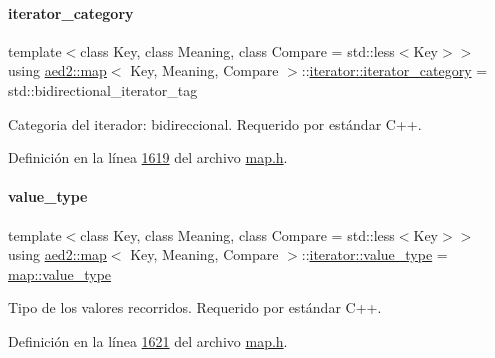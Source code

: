 \begin{Indent}
\paragraph{\texorpdfstring{iterator\+\_\+category}{iterator\_category}}
{\footnotesize\ttfamily template$<$class Key, class Meaning, class Compare = std\+::less$<$\+Key$>$$>$ \\
using \hyperlink{classaed2_1_1map}{aed2\+::map}$<$ Key, Meaning, Compare $>$\+::\hyperlink{classaed2_1_1map_1_1iterator_a709df3d8aef6fd1eeb839616b554ff0b_a709df3d8aef6fd1eeb839616b554ff0b}{iterator\+::iterator\+\_\+category} =  std\+::bidirectional\+\_\+iterator\+\_\+tag}



Categoria del iterador\+: bidireccional. Requerido por estándar C++. 



Definición en la línea \hyperlink{map_8h_source_l01619}{1619} del archivo \hyperlink{map_8h_source}{map.\+h}.

\mbox{\label{classaed2_1_1map_1_1iterator_a4e1d954ef5c6a64bbcd881854f039a16_a4e1d954ef5c6a64bbcd881854f039a16}} 
\paragraph{\texorpdfstring{value\+\_\+type}{value\_type}}
{\footnotesize\ttfamily template$<$class Key, class Meaning, class Compare = std\+::less$<$\+Key$>$$>$ \\
using \hyperlink{classaed2_1_1map}{aed2\+::map}$<$ Key, Meaning, Compare $>$\+::\hyperlink{classaed2_1_1map_1_1iterator_a4e1d954ef5c6a64bbcd881854f039a16_a4e1d954ef5c6a64bbcd881854f039a16}{iterator\+::value\+\_\+type} =  \hyperlink{classaed2_1_1map_a719db98e0ff9a837610f76be33264680_a719db98e0ff9a837610f76be33264680}{map\+::value\+\_\+type}}



Tipo de los valores recorridos. Requerido por estándar C++. 



Definición en la línea \hyperlink{map_8h_source_l01621}{1621} del archivo \hyperlink{map_8h_source}{map.\+h}.

\mbox{\label{classaed2_1_1map_1_1iterator_ac19788914a3110897e44c53f1318f6af_ac19788914a3110897e44c53f1318f6af}} 

\end{Indent}
